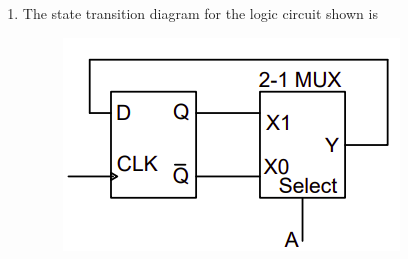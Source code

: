 \documentclass[journal,12pt,onecolumn]{IEEEtran}
\theoremstyle{remark}
\begin{document}
\begin{enumerate}[start=1, label=Q.\arabic*]
\begin{enumerate}
\end{enumerate}
\hfill{}
\item The state transition diagram for the logic circuit shown is
\begin{figure}[H]
    \centering
    \includegraphics[width=0.4\columnwidth]{Figures/q30.png}
    \caption{}
\end{figure}


\end{enumerate}
\end{document}
